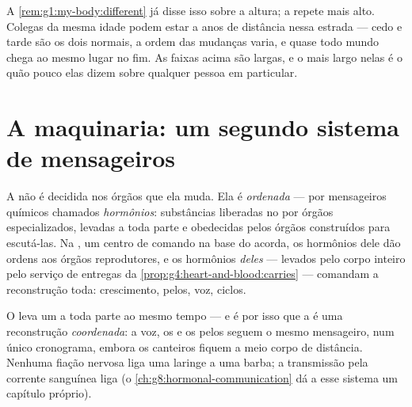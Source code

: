 \begin{remark}\label{rem:g8:puberty:timetable}
A \cref{rem:g1:my-body:different} já disse isso sobre a altura; a
 repete mais alto. Colegas da mesma idade podem estar a anos
de distância nessa estrada --- cedo e tarde são os dois normais, a
ordem das mudanças varia, e quase todo mundo chega ao mesmo lugar no
fim. As faixas acima são largas, e o mais largo nelas é o quão pouco
elas dizem sobre qualquer pessoa em particular.
\end{remark}

\section{A maquinaria: um segundo sistema de mensageiros}

\begin{definition}\label{def:g8:puberty:hormones}
A  não é decidida nos órgãos que ela muda. Ela é
\emph{ordenada} --- por mensageiros químicos chamados
\emph{hormônios}: substâncias liberadas no
\emph{} por órgãos especializados, levadas a toda parte e
obedecidas pelos órgãos construídos para escutá-las. Na , um
centro de comando na base do  acorda, os hormônios dele dão
ordens aos órgãos reprodutores, e os hormônios \emph{deles} --- levados
pelo corpo inteiro pelo serviço de entregas da
\cref{prop:g4:heart-and-blood:carries} --- comandam a reconstrução
toda: crescimento, pelos, voz, ciclos.
\end{definition}

\begin{example}\label{ex:g8:puberty:sites}
O  leva um  a toda parte ao mesmo tempo --- e é por isso
que a  é uma reconstrução \emph{coordenada}: a voz, os 
e os pelos seguem o mesmo mensageiro, num único cronograma, embora os
canteiros fiquem a meio corpo de distância. Nenhuma fiação nervosa
liga uma laringe a uma barba; a transmissão pela corrente sanguínea
liga (o \cref{ch:g8:hormonal-communication} dá a esse sistema um
capítulo próprio).
\end{example}

